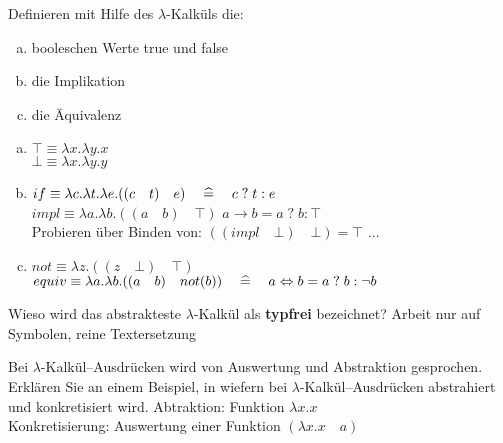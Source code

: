 \begin{card}
	Definieren mit Hilfe des $\lambda$-Kalküls die:
	\begin{enumerate}[a)]
    \item booleschen Werte true und false
    \item die Implikation
    \item die Äquivalenz
	\end{enumerate}
	\hr
	\begin{enumerate}[a)]
    \item $\top \equiv \lambda x.\lambda y . x$\\
        $\bot \equiv \lambda x.\lambda y . y$
    \item $if \equiv \lambda c.\lambda t.\lambda e.((c \quad t) \quad e) \quad \mathrel{\widehat{=}} \quad c \; ? \; t : e$ \\
        $impl \equiv \lambda a.\lambda b.((a \quad b) \quad \top)$ \quad \ent \quad $a \rightarrow b = a \; ? \; b : \top$ \\
        Probieren über Binden von: $((impl \quad \bot) \quad \bot) = \top$ ...
    \item	$not \equiv \lambda z.((z \quad \bot) \quad \top)$\\
        $equiv \equiv  \lambda a.\lambda b.((a \quad b) \quad not(b)) \quad \mathrel{\widehat{=}} \quad a \Leftrightarrow b = a \; ? \; b : \neg b$
	\end{enumerate}
\end{card}

\begin{card}
	Wieso wird das abstrakteste $\lambda$-Kalkül als \textbf{typfrei} bezeichnet?
	\hr
	Arbeit nur auf Symbolen, reine Textersetzung
\end{card}

\begin{card}
  Bei $\lambda$-Kalkül--Ausdrücken wird von Auswertung und Abstraktion gesprochen. Erklären Sie an einem Beispiel, in wiefern bei $\lambda$-Kalkül--Ausdrücken abstrahiert und konkretisiert wird.
  \hr
  Abtraktion: Funktion $\lambda x.x$\\
  Konkretisierung: Auswertung einer Funktion $(\lambda x.x \quad a)$
\end{card}

